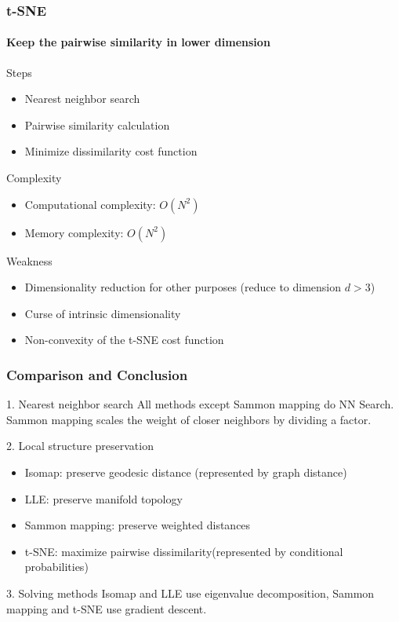 \documentclass{beamer}
\begin{document}
% 
% 
% 
% 
% 
%
\begin{frame}
  \frametitle{t-SNE}
  \framesubtitle{Keep the pairwise similarity in lower dimension}

  
  {Steps}
  \begin{itemize}
    \item Nearest neighbor search
    \item Pairwise similarity calculation
    \item Minimize dissimilarity cost function
  \end{itemize}

  {Complexity}
    \begin{itemize}
      \item Computational complexity: $O(N^2)$
      \item Memory complexity: $O(N^2)$
    \end{itemize}

    {Weakness}
    \begin{itemize}
      \item Dimensionality reduction for other purposes (reduce to dimension $d > 3$)
      \item Curse of intrinsic dimensionality 
      \item Non-convexity of the t-SNE cost function
    \end{itemize}    
    
\end{frame}

% 
% 
% 
% 
% 
%
\begin{frame}
  \frametitle{Comparison and Conclusion}

  \begin{block}{1. Nearest neighbor search}
    All methods except Sammon mapping do NN Search. Sammon mapping scales the weight of closer neighbors by dividing a factor.
  \end{block}

  \begin{block}{2. Local structure preservation}
    \begin{itemize}
      \item Isomap: preserve geodesic distance (represented by graph distance)
      \item LLE: preserve manifold topology
      \item Sammon mapping: preserve weighted distances 
      \item t-SNE: maximize pairwise dissimilarity(represented by conditional probabilities)
    \end{itemize}
  \end{block}

  \begin{block}{3. Solving methods}
    Isomap and LLE use eigenvalue decomposition, Sammon mapping and t-SNE use gradient descent.
  \end{block}
    
\end{frame}
\end{document}
